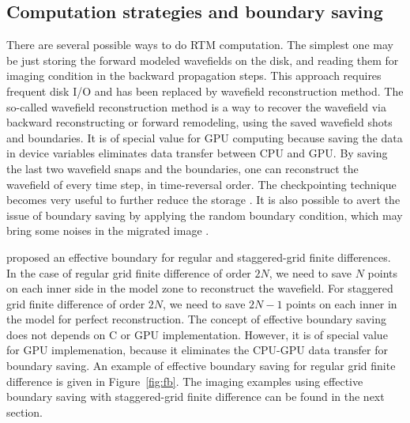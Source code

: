 \begin{comment}
\inputdir{rtmadcig}
\plot{veladcig}{width=0.6\textwidth}{Simple velocity model including 2 layers: 200x200, dz=dz=5m. Source location: 500m on the surface. Earth layer at depth 0.5km.}

\plot{adcig,stackedimage}{width=0.45\textwidth}{(a) The ADCIG at 0.45km. (b) The RTM image by stacking all ADCIGs.}

\plot{vecxz}{width=0.9\textwidth}{The x and z components indicate the directional Poynting vectors are working.}

\end{comment}

\subsection{Computation strategies and boundary saving}

There are several possible ways to do RTM computation. The simplest one may be just storing the forward modeled wavefields on the disk, and reading them for imaging condition in the backward propagation steps. This approach requires frequent disk I/O and has been replaced by wavefield reconstruction method. The so-called wavefield reconstruction method is a way to recover the wavefield via backward reconstructing or forward remodeling, using the saved wavefield shots and boundaries. It is of special value for GPU computing because saving the data in device variables eliminates data transfer between CPU and GPU. By saving the last two wavefield snaps and the boundaries, one can reconstruct the wavefield of every time step, in time-reversal order. The checkpointing technique becomes very useful to further reduce the storage \citep{symes2007reverse,dussaud2008computational}. It is also possible to avert the issue of boundary saving by applying the random boundary condition, which may bring some noises in the migrated image \citep{clapp2009reverse,clapp2010selecting,liu2013wavefield,liu20133d}.

\cite{Yang2014gpurtm} proposed an effective boundary for regular and staggered-grid finite differences.  In the case of regular grid finite difference of order $2N$, we need to save $N$ points on each inner side in the model zone to reconstruct the wavefield. For staggered grid finite difference of order $2N$, we need to save $2N-1$ points on each inner in the model for perfect reconstruction.  The concept of effective boundary saving does not depends on C or GPU implementation. However, it is of special value for GPU implemenation,  because it eliminates the CPU-GPU data transfer for boundary saving.  An example of effective boundary saving for regular grid finite difference is given in Figure~\ref{fig:fb}. The imaging examples using effective boundary saving with staggered-grid finite difference can be found in the next section.

